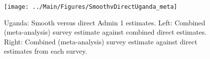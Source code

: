 \documentclass[12pt]{article}\usepackage[]{graphicx}\usepackage[]{color}
\newenvironment{knitrout}{}{} %
\begin{document}

\begin{knitrout}
\color{fgcolor}\begin{figure}[bht]

{\centering \texttt{[image: ../Main/Figures/SmoothvDirectUganda\_meta]} 

}

\caption[Uganda]{Uganda: Smooth versus direct Admin 1 estimates. Left: Combined (meta-analysis) survey estimate against combined direct estimates. Right: Combined (meta-analysis) survey estimate against direct estimates from each survey.}\label{fig:unnamed-chunk-323}
\end{figure}


\end{knitrout}
\end{document}
